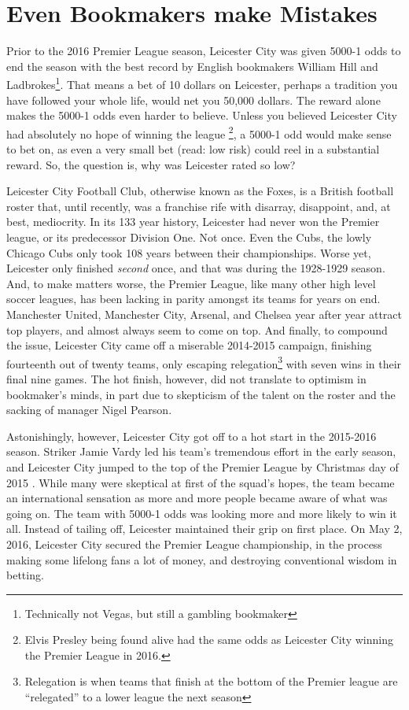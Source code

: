 \documentclass[12pt,twoside]{book}
\begin{document}
	\section{Even Bookmakers make Mistakes}
Prior to the 2016 Premier League season, Leicester City was given 5000-1 odds to end the season with the best record by English bookmakers William Hill and Ladbrokes\footnote{Technically not Vegas, but still a gambling bookmaker}. That means a bet of 10 dollars on Leicester, perhaps a tradition you have followed your whole life, would net you 50,000 dollars.  The reward alone makes the 5000-1 odds even harder to believe.  Unless you believed Leicester City had absolutely no hope of winning the league \footnote{Elvis Presley being found alive had the same odds as Leicester City winning the Premier League in 2016.},\cite{leicester} a 5000-1 odd would make sense to bet on, as even a very small bet (read: low risk) could reel in a substantial reward.  So, the question is, why was Leicester rated so low?

Leicester City Football Club, otherwise known as the Foxes, is a British football roster that, until recently, was a franchise rife with disarray, disappoint, and, at best, mediocrity.  In its 133 year history, Leicester had never won the Premier league, or its predecessor Division One.  Not once.  Even the Cubs, the lowly Chicago Cubs only took 108 years between their championships.  Worse yet, Leicester only finished \emph{second} once, and that was during the 1928-1929 season.\cite{Leicester2}  And, to make matters worse, the Premier League, like many other high level soccer leagues, has been lacking in parity amongst its teams for years on end.  Manchester United, Manchester City, Arsenal, and Chelsea year after year attract top players, and almost always seem to come on top. And finally, to compound the issue, Leicester City came off a miserable 2014-2015 campaign, finishing fourteenth out of twenty teams, only escaping relegation\footnote{Relegation is when teams that finish at the bottom of the Premier league are ``relegated'' to a lower league the next season} with seven wins in their final nine games.\cite{Leicester3}  
The hot finish, however, did not translate to optimism in bookmaker's minds, in part due to skepticism of the talent on the roster and the sacking of manager Nigel Pearson.

Astonishingly, however, Leicester City got off to a hot start in the 2015-2016 season. Striker Jamie Vardy  led his team's tremendous effort in the early season, and Leicester City jumped to the top of the Premier League by Christmas day of 2015
.  While many were skeptical at first of the squad's hopes, the team became an international sensation as more and more people became aware of what was going on.  The team with 5000-1 odds was looking more and more likely to win it all.  Instead of tailing off, Leicester maintained their grip on first place.  On May 2, 2016, Leicester City secured the Premier League championship, in the process making some lifelong fans a lot of money, and destroying conventional wisdom in betting. 
\end{document}

